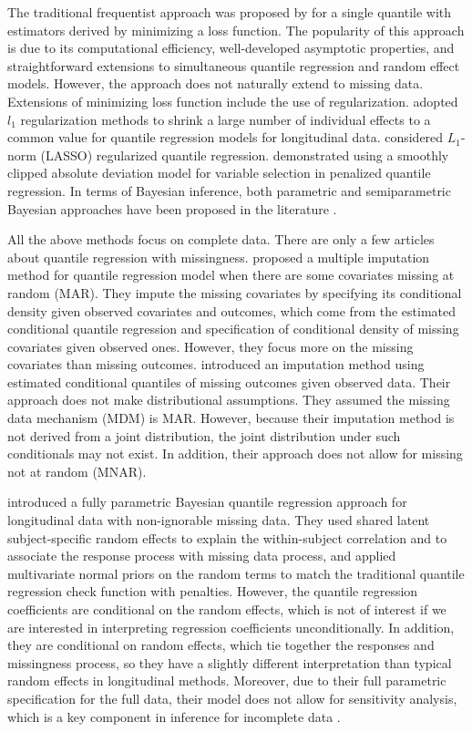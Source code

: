 \documentclass[12pt]{article}
\begin{document}
The traditional frequentist approach was proposed by
\citet{koenker1978} for a single quantile with estimators derived by
minimizing a loss function. The popularity of this approach is due to
its computational efficiency, well-developed asymptotic properties,
and straightforward extensions to simultaneous quantile regression and
random effect models. However, the approach does not naturally
extend to missing data.
Extensions of minimizing loss function include the use of regularization.
\citet{koenker2004} adopted $l_1$ regularization methods to shrink a large number of individual effects to a common value for quantile regression models for longitudinal data.
\citet{li2008} considered $L_1$-norm (LASSO) regularized quantile regression.
\citet{wu2009} demonstrated using a smoothly clipped absolute deviation model for variable selection in penalized quantile regression.
In terms of Bayesian inference, both parametric and semiparametric Bayesian approaches have been proposed in the literature \citep{yu2001,walker1999,hanson2002,reich2010}.

All the above methods focus on complete data.  There are only a few
articles about quantile regression with missingness.  \citet{wei2012}
proposed a multiple imputation method for quantile regression model
when there are some covariates missing at random (MAR). They impute
the missing covariates by specifying its conditional density given
observed covariates and outcomes, which come from the estimated
conditional quantile regression and specification of conditional
density of missing covariates given observed ones.
However, they focus more on the missing covariates than missing outcomes.
\citet{bottai2013} introduced an imputation method using estimated
conditional quantiles of missing outcomes given observed data. Their
approach does not make distributional assumptions.  They assumed the
missing data mechanism (MDM) is MAR. However, because their
imputation method is not derived from a joint distribution, the joint
distribution under such conditionals may not exist.  In addition, their
approach does not allow for missing not at random (MNAR).

\citet{yuan2010} introduced a fully parametric Bayesian quantile
regression approach for longitudinal data with non-ignorable missing
data. They used shared latent subject-specific random effects to
explain the within-subject correlation and to associate the response
process with missing data process, and applied multivariate normal
priors on the random terms to match the traditional quantile
regression check function with penalties. However, the quantile
regression coefficients are conditional on the random effects, which
is not of interest if we are interested in interpreting regression
coefficients unconditionally.  In addition, they are
conditional on random effects, which tie together the responses and
missingness process, so they have a slightly different interpretation
than typical random effects in longitudinal methods. Moreover, due to
their full parametric specification for the full data, their model
does not allow for sensitivity analysis, which is a key component in
inference for incomplete data \citep{nas2010}.
\end{document}
